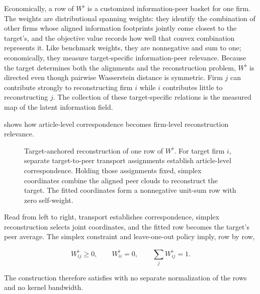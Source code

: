 Economically, a row of $W^\flat$ is a customized information-peer basket for
one firm.
The weights are distributional spanning weights: they identify the combination
of other firms whose aligned information footprints jointly come closest to the
target's, and the objective value records how well that convex combination
represents it.
Like benchmark weights, they are nonnegative and sum to one; economically, they
measure target-specific information-peer relevance.
Because the target determines both the alignments and the reconstruction
problem, $W^\flat$ is directed even though pairwise Wasserstein distance is
symmetric.
Firm $j$ can contribute strongly to reconstructing firm $i$ while $i$
contributes little to reconstructing $j$.
The collection of these target-specific relations is the measured map of the
latent information field.

 shows how article-level correspondence
becomes firm-level reconstruction relevance.

\begin{figure}[htbp]
  \centering
  \caption{Target-anchored reconstruction of one row of $W^\flat$.
    For target firm $i$, separate target-to-peer transport assignments establish
    article-level correspondence.
    Holding those assignments fixed, simplex coordinates combine the aligned
    peer clouds to reconstruct the target.
  The fitted coordinates form a nonnegative unit-sum row with zero self-weight.}
  \label{fig:w2-operator-construction}
\end{figure}

Read from left to right, transport establishes correspondence, simplex
reconstruction selects joint coordinates, and the fitted row becomes the
target's peer average.
The simplex constraint and leave-one-out policy imply, row by row,

\[
  W^\flat_{ij}\geq0,\qquad W^\flat_{ii}=0,\qquad
  \sum_{j} W^\flat_{ij}=1.
\]

The construction therefore satisfies  with no
separate normalization of the rows and no kernel bandwidth.

